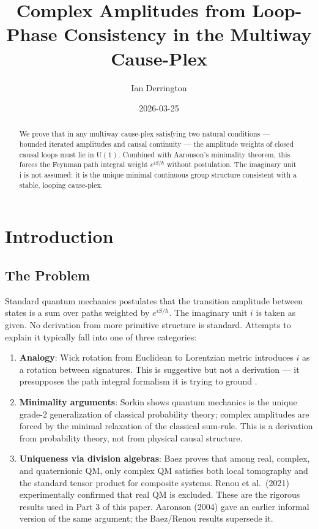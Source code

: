 \documentclass[11pt]{article}
\title{Complex Amplitudes from Loop-Phase Consistency in the Multiway Cause-Plex}
\author{Ian Derrington}
\date{2026-03-25}
\theoremstyle{definition}
\theoremstyle{remark}
\begin{document}
\maketitle

\begin{abstract}
We prove that in any multiway cause-plex satisfying two natural conditions — bounded iterated amplitudes and causal continuity — the amplitude weights of closed causal loops must lie in $\mathrm{U}(1)$. Combined with Aaronson's minimality theorem, this forces the Feynman path integral weight $e^{iS/\hbar}$ without postulation. The imaginary unit i is not assumed: it is the unique minimal continuous group structure consistent with a stable, looping cause-plex.
\end{abstract}

\medskip

\section{Introduction}\label{introduction}

\subsection{The Problem}\label{the-problem}

Standard quantum mechanics postulates that the transition amplitude
between states is a sum over paths weighted by \(e^{iS/\hbar}\). The
imaginary unit \(i\) is taken as given. No derivation from more
primitive structure is standard. Attempts to explain it typically fall
into one of three categories:

\begin{enumerate}
\def\labelenumi{\arabic{enumi}.}
\item
  \textbf{Analogy}: Wick rotation from Euclidean to Lorentzian metric
  introduces \(i\) as a rotation between signatures. This is suggestive
  but not a derivation --- it presupposes the path integral formalism it
  is trying to ground \cite{Gorard2020}.
\item
  \textbf{Minimality arguments}: Sorkin \cite{Sorkin1994} shows quantum
  mechanics is the unique grade-2 generalization of classical
  probability theory; complex amplitudes are forced by the minimal
  relaxation of the classical sum-rule. This is a derivation from
  probability theory, not from physical causal structure.
\item
  \textbf{Uniqueness via division algebras}: Baez \cite{Baez2012} proves
  that among real, complex, and quaternionic QM, only complex QM
  satisfies both local tomography and the standard tensor product for
  composite systems. Renou et al.~(2021) experimentally confirmed that
  real QM is excluded. These are the rigorous results used in Part 3 of
  this paper. Aaronson (2004) gave an earlier informal version of the
  same argument; the Baez/Renou results supersede it.
\end{enumerate}
\end{document}
